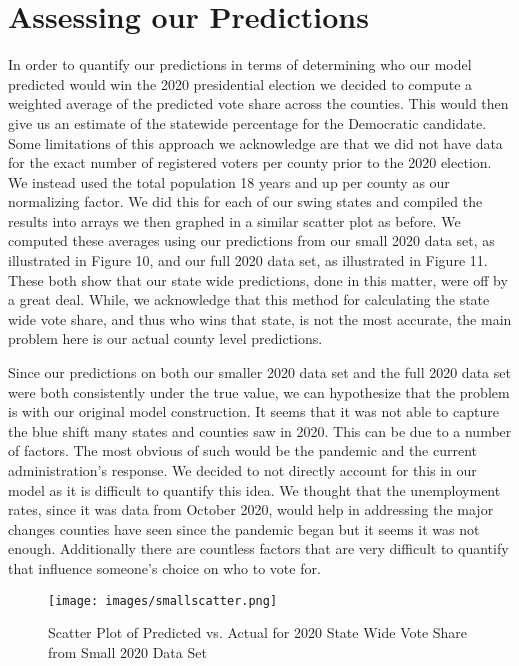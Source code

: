 \documentclass[letterpaper, twocolumn]{article}
\begin{document}
\section{Assessing our Predictions}
In order to quantify our predictions in terms of determining who our model predicted would win the 2020 presidential election we decided to compute a weighted average of the predicted vote share across the counties. This would then give us an estimate of the statewide percentage for the Democratic candidate. Some limitations of this approach we acknowledge are that we did not have data for the exact number of registered voters per county prior to the 2020 election. We instead used the total population 18 years and up per county as our normalizing factor. We did this for each of our swing states and compiled the results into arrays we then graphed in a similar scatter plot as before. We computed these averages using our predictions from our small 2020 data set, as illustrated in Figure 10, and our full 2020 data set, as illustrated in Figure 11. These both show that our state wide predictions, done in this matter, were off by a great deal. While, we acknowledge that this method for calculating the state wide vote share, and thus who wins that state, is not the most accurate, the main problem here is our actual county level predictions. 

Since our predictions on both our smaller 2020 data set and the full 2020 data set were both consistently under the true value, we can hypothesize that the problem is with our original model construction. It seems that it was not able to capture the blue shift many states and counties saw in 2020. This can be due to a number of factors. The most obvious of such would be the pandemic and the current administration's response. We decided to not directly account for this in our model as it is difficult to quantify this idea. We thought that the unemployment rates, since it was data from October 2020, would help in addressing the major changes counties have seen since the pandemic began but it seems it was not enough. Additionally there are countless factors that are very difficult to quantify that influence someone's choice on who to vote for. 

\begin{figure}[h]
    \centering
    \texttt{[image: images/smallscatter.png]}
    \caption{Scatter Plot of Predicted vs. Actual for 2020 State Wide Vote Share from Small 2020 Data Set}
    \label{fig:arstmade}
\end{figure}
\end{document}
